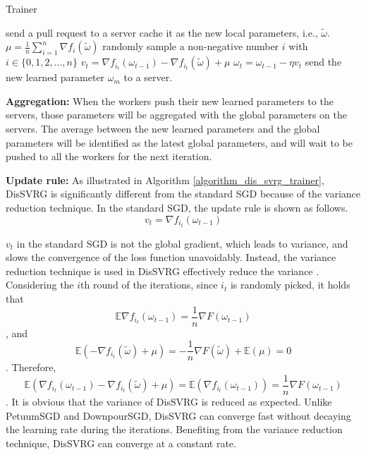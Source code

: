 \documentclass[10pt,journal,finalsubmission,compsoc]{IEEEtran}
\begin{document}
\begin{algorithm}[t]
    \caption{Trainer}
    \label{algorithm_dis_svrg_trainer}
    \begin{algorithmic}[1]
            \State send a pull request to a server
                    \State cache it as the new local parameters, i.e., $\tilde{\omega}$.
                    \State $\mu=\frac{1}{n}\sum\limits_{i=1}^n\nabla f_i(\tilde{\omega})$
                       \State randomly sample a non-negative number $i$ with $i\in\{0,1, 2,...,n\}$
	              \State $v_t=\nabla f_{i_t}(\omega_{t-1})-\nabla f_{i_t}(\tilde{\omega})+\mu$ 
	              \State $\omega_t=\omega_{t-1}-\eta v_t$ 
                    \EndFor
                    \State send the new learned parameter $\omega_m$ to a server.
               \EndIf 
        \EndWhile
      \EndWhile
    \end{algorithmic}
\end{algorithm}

\textbf{Aggregation:} When the workers push their new learned parameters to the servers, those parameters will be aggregated with the global parameters on the servers. The average between the new learned parameters and the global parameters will be identified as the latest global parameters, and will wait to be pushed to all the workers for the next iteration.


\textbf{Update rule:} As illustrated in Algorithm \ref{algorithm_dis_svrg_trainer}, DisSVRG is significantly different from the standard SGD because of the variance reduction technique. In the standard SGD, the update rule is shown as follows.
\begin{equation}
\label{standard_sgd}
v_t=\nabla f_{i_t}(\omega_{t-1})
\end{equation}

$v_t$ in the standard SGD is not the global gradient, which leads to variance, and slows the convergence of the loss function unavoidably. Instead, the variance reduction technique is used in DisSVRG effectively reduce the variance \cite{Johnson:9MAvkbgy}. Considering the $i$th round of the iterations, since $i_t$ is randomly picked, it holds that 
\begin{equation}
\mathbb{E}\nabla f_{i_t}(\omega_{t-1})=\frac{1}{n}\nabla F(\omega_{t-1})
\end{equation}, and
\begin{equation}
\mathbb{E}(-\nabla f_{i_t}(\tilde{\omega})+\mu)=-\frac{1}{n} \nabla F(\tilde{\omega})+\mathbb{E}(\mu)=0
\end{equation}. Therefore, 
\begin{equation}
\mathbb{E}(\nabla f_{i_t}(\omega_{t-1})-\nabla f_{i_t}(\tilde{\omega})+\mu)=\mathbb{E}(\nabla f_{i_t}(\omega_{t-1}))=\frac{1}{n}\nabla F(\omega_{t-1})
\end{equation}. It is obvious that the variance of DisSVRG is reduced as expected. Unlike PetuumSGD and DownpourSGD, DisSVRG can converge fast without decaying the learning rate during the iterations. Benefiting from the variance reduction technique, DisSVRG  can converge at a constant rate.
\end{document}
